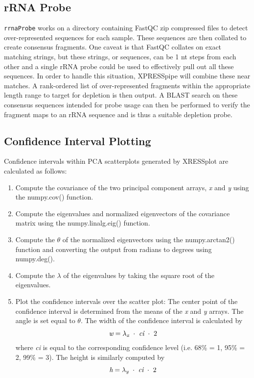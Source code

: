 \documentclass[10pt, oneside]{article}
\begin{document}
\subsection{rRNA Probe}
\texttt{rrnaProbe} works on a directory containing FastQC \cite{fastqc} zip compressed files to detect over-represented sequences for each sample. These sequences are then collated to create consensus fragments. One caveat is that FastQC collates on exact matching strings, but these strings, or sequences, can be 1 nt steps from each other and a single rRNA probe could be used to effectively pull out all these sequences. In order to handle this situation, XPRESSpipe will combine these near matches. A rank-ordered list of over-represented fragments within the appropriate length range to target for depletion is then output. A BLAST \cite{blast} search on these consensus sequences intended for probe usage can then be performed to verify the fragment maps to an rRNA sequence and is thus a suitable depletion probe.

\subsection{Confidence Interval Plotting}
Confidence intervals within PCA scatterplots generated by XRESSplot are calculated as follows:

\begin{enumerate}
  \item Compute the covariance of the two principal component arrays, \textit{x} and \textit{y} using the numpy.cov() function.

  \item Compute the eigenvalues and normalized eigenvectors of the covariance matrix using the numpy.linalg.eig() function.

  \item Compute the $\theta$ of the normalized eigenvectors using the numpy.arctan2() function and converting the output from radians to degrees using numpy.deg().

  \item Compute the $\lambda$ of the eigenvalues by taking the square root of the eigenvalues.

  \item Plot the confidence intervals over the scatter plot: The center point of the confidence interval is determined from the means of the \textit{x} and \textit{y} arrays. The angle is set equal to $\theta$. The width of the confidence interval is calculated by
  \[
  \textit{w} = \lambda _{\textit{\scriptsize{x}}}\ \cdot\ \textit{ci}\ \cdot\ 2
  \]
  where \textit{ci} is equal to the corresponding confidence level (i.e. 68\% = 1, 95\% = 2, 99\% = 3). The height is similarly computed by
  \[
  \textit{h} = \lambda _{\textit{\scriptsize{y}}}\ \cdot\ \textit{ci}\ \cdot\ 2
  \]
\end{enumerate}
\end{document}

